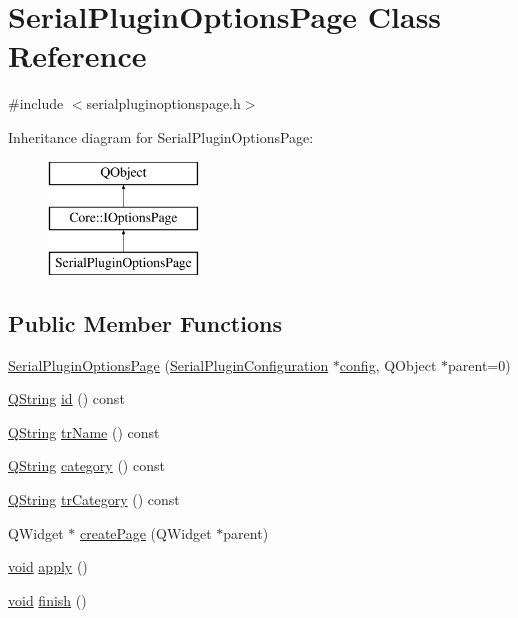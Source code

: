 \hypertarget{class_serial_plugin_options_page}{\section{Serial\-Plugin\-Options\-Page Class Reference}
\label{class_serial_plugin_options_page}
}


{\ttfamily \#include $<$serialpluginoptionspage.\-h$>$}

Inheritance diagram for Serial\-Plugin\-Options\-Page\-:\begin{figure}[H]
\begin{center}
\leavevmode
\includegraphics[height=3.000000cm]{class_serial_plugin_options_page}
\end{center}
\end{figure}
\subsection*{Public Member Functions}
\begin{DoxyCompactItemize}
\item 
\hyperlink{group___serial_plugin_gabbba5e225f4b24b0ff2762edd89a7c85}{Serial\-Plugin\-Options\-Page} (\hyperlink{class_serial_plugin_configuration}{Serial\-Plugin\-Configuration} $\ast$\hyperlink{deflate_8c_a4473b5227787415097004fd39f55185e}{config}, Q\-Object $\ast$parent=0)
\item 
\hyperlink{group___u_a_v_objects_plugin_gab9d252f49c333c94a72f97ce3105a32d}{Q\-String} \hyperlink{group___serial_plugin_gaadfb80c5939566ed536ef5e6d49601fd}{id} () const 
\item 
\hyperlink{group___u_a_v_objects_plugin_gab9d252f49c333c94a72f97ce3105a32d}{Q\-String} \hyperlink{group___serial_plugin_ga6558090ef30ec926b500dc27787f194a}{tr\-Name} () const 
\item 
\hyperlink{group___u_a_v_objects_plugin_gab9d252f49c333c94a72f97ce3105a32d}{Q\-String} \hyperlink{group___serial_plugin_ga11d58b7fe11ee48ac5a865eaea4d9a13}{category} () const 
\item 
\hyperlink{group___u_a_v_objects_plugin_gab9d252f49c333c94a72f97ce3105a32d}{Q\-String} \hyperlink{group___serial_plugin_ga65036a91c24758081e8a2cecc44925a0}{tr\-Category} () const 
\item 
Q\-Widget $\ast$ \hyperlink{group___serial_plugin_ga77331da48998f8e92c60751f5e2ab862}{create\-Page} (Q\-Widget $\ast$parent)
\item 
\hyperlink{group___u_a_v_objects_plugin_ga444cf2ff3f0ecbe028adce838d373f5c}{void} \hyperlink{group___serial_plugin_ga442981f9537c634cbc6bd160f30c0a8a}{apply} ()
\item 
\hyperlink{group___u_a_v_objects_plugin_ga444cf2ff3f0ecbe028adce838d373f5c}{void} \hyperlink{group___serial_plugin_ga7d5463f2125597e0962512fde1cd83e4}{finish} ()
\end{DoxyCompactItemize}


